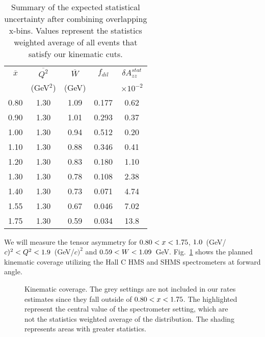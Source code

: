 \begin{table}
\begin{center}
\begin{tabular}{c|c|c|c|c}
 $\overline{x}$  & $\overline{Q^2}$  &  $\overline{W}$ & $f_{dil}$ & $\delta A_{zz}^{stat}$ \\
     & (GeV$^2$)  & (GeV) &  & $\times 10^{-2}$  \\
\hline\hline
    0.80		&  1.30	&  1.09 &  0.177	 & 0.62	\\
    0.90		&  1.30	&  1.01 &  0.293	 & 0.37	\\
    1.00		&  1.30	&  0.94 &  0.512	 & 0.20	\\
    1.10		&  1.30	&  0.88 &  0.346	 & 0.41	\\  
    1.20		&  1.30	&  0.83 &  0.180	 & 1.10	\\  
    1.30		&  1.30	&  0.78 &  0.108	 & 2.38	\\  
    1.40		&  1.30	&  0.73 &  0.071	 & 4.74	\\  
    1.55		&  1.30	&  0.67 &  0.046	 & 7.02	\\              
    1.75		&  1.30	&  0.59 &  0.034	 & 13.8	\\  
\hline\hline
\end{tabular}
\caption{\label{RATES2}Summary of the expected statistical uncertainty after combining overlapping x-bins.  Values represent the statistics weighted average of all events that satisfy our kinematic cuts. }
\end{center}
\end{table}




\label{EXP}
We will measure the tensor asymmetry \Azz for $0.80<x<1.75$, $1.0$~(GeV/$c)^2 < Q^2 <1.9$~(GeV/$c)^2$ and $0.59 < W < 1.09$~GeV. Fig.~\ref{kincov} shows the planned kinematic coverage utilizing the Hall C HMS and SHMS spectrometers at forward angle.

\begin{figure}
\begin{center}
\caption{\label{kincov} Kinematic coverage.  The grey settings are not included in our rates estimates since they fall outside of $0.80 < x < 1.75$. The highlighted represent the central value of the spectrometer setting, which are not the statistics weighted average of the distribution. The shading represents areas with greater statistics.}
\end{center}
\end{figure}


